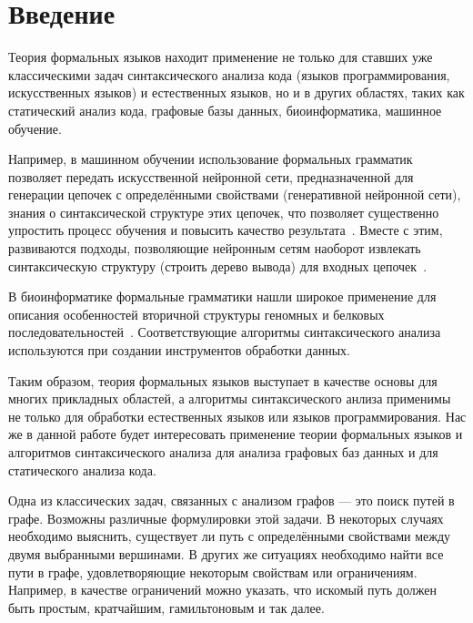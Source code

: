 \chapter*{Введение}

Теория формальных языков находит применение не только для ставших уже классическими задач синтаксического анализа кода (языков программирования, искусственных языков) и естественных языков, но и в других областях, таких как статический анализ кода, графовые базы данных, биоинформатика, машинное обучение.

Например, в машинном обучении использование формальных грамматик позволяет передать искусственной нейронной сети, предназначенной для генерации цепочек с определёнными свойствами (генеративной нейронной сети), знания о синтаксической структуре этих цепочек, что позволяет существенно упростить процесс обучения и повысить качество результата~\cite{10.5555/3305381.3305582}.
Вместе с этим, развиваются подходы, позволяющие нейронным сетям наоборот извлекать синтаксическую структуру (строить дерево вывода) для входных цепочек~\cite{kasai-etal-2017-tag,kasai-etal-2018-end}.

В биоинформатике формальные грамматики нашли широкое применение для описания особенностей вторичной структуры геномных и белковых последовательностей~\cite{Dyrka2019,WJAnderson2012,zier2013rna}.
Соответствующие алгоритмы синтаксического анализа используются при создании инструментов обработки данных.

Таким образом, теория формальных языков выступает в качестве основы для многих прикладных областей, а алгоритмы синтаксического анлиза применимы не только для обработки естественных языков или языков программирования.
Нас же в данной работе будет интересовать применение теории формальных языков и алгоритмов синтаксического анализа для анализа графовых баз данных и для статического анализа кода.

Одна из классических задач, связанных с анализом графов --- это поиск путей в графе.
Возможны различные формулировки этой задачи.
В некоторых случаях необходимо выяснить, существует ли путь с определёнными свойствами между двумя выбранными вершинами.
В других же ситуациях необходимо найти все пути в графе, удовлетворяющие некоторым свойствам или ограничениям. 
Например, в качестве ограничений можно указать, что искомый путь должен быть простым, кратчайшим, гамильтоновым и так далее.


